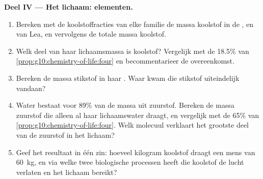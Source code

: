 \begin{problem}
\medskip
\noindent\textbf{Deel IV --- Het lichaam: elementen.}
\begin{enumerate}[resume]
  \item Bereken met de koolstoffracties van elke familie de massa
        koolstof in de ,  en  van Lea, en
        vervolgens de totale massa koolstof.
  \item Welk deel van haar lichaamsmassa is koolstof? Vergelijk met de
        18.5\% van \cref{prop:g10:chemistry-of-life:four} en
        becommentarieer de overeenkomst.
  \item Bereken de massa stikstof in haar . Waar kwam die
        stikstof uiteindelijk vandaan?
  \item Water bestaat voor 89\% van de massa uit zuurstof. Bereken de
        massa zuurstof die alleen al haar lichaamswater draagt, en
        vergelijk met de 65\% van
        \cref{prop:g10:chemistry-of-life:four}. Welk molecuul verklaart
        het grootste deel van de zuurstof in het lichaam?
  \item Geef het resultaat in één zin: hoeveel kilogram koolstof draagt
        een mens van \qty{60}{kg}, en via welke twee biologische
        processen heeft die koolstof de lucht verlaten en het lichaam
        bereikt?
\end{enumerate}
\end{problem}
